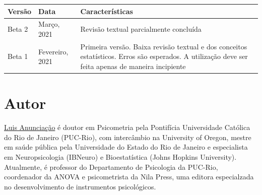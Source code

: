 \documentclass[
]{book}
\begin{document}
\begin{longtable}[]{@{}lll@{}}
\toprule
\begin{minipage}[b]{0.19\columnwidth}\raggedright
Versão\strut
\end{minipage} & \begin{minipage}[b]{0.35\columnwidth}\raggedright
Data\strut
\end{minipage} & \begin{minipage}[b]{0.38\columnwidth}\raggedright
Características\strut
\end{minipage}\tabularnewline
\midrule
\endhead
\begin{minipage}[t]{0.19\columnwidth}\raggedright
Beta 2\strut
\end{minipage} & \begin{minipage}[t]{0.35\columnwidth}\raggedright
Março, 2021\strut
\end{minipage} & \begin{minipage}[t]{0.38\columnwidth}\raggedright
Revisão textual parcialmente concluída\strut
\end{minipage}\tabularnewline
\begin{minipage}[t]{0.19\columnwidth}\raggedright
Beta 1\strut
\end{minipage} & \begin{minipage}[t]{0.35\columnwidth}\raggedright
Fevereiro, 2021\strut
\end{minipage} & \begin{minipage}[t]{0.38\columnwidth}\raggedright
Primeira versão. Baixa revisão textual e dos conceitos estatísticos. Erros são esperados. A utilização deve ser feita apenas de maneira incipiente\strut
\end{minipage}\tabularnewline
\bottomrule
\end{longtable}

\hypertarget{autor}{%
\section{Autor}\label{autor}}

\href{http://lattes.cnpq.br/3982200733248687}{Luis Anunciação} é doutor em Psicometria pela Pontifícia Universidade Católica do Rio de Janeiro (PUC-Rio), com intercâmbio na University of Oregon, mestre em saúde pública pela Universidade do Estado do Rio de Janeiro e especialista em Neuropsicologia (IBNeuro) e Bioestatística (Johns Hopkins University). Atualmente, é professor do Departamento de Psicologia da PUC-Rio, coordenador da ANOVA e psicometrista da Nila Press, uma editora especialzada no desenvolvimento de instrumentos psicológicos.
\end{document}
